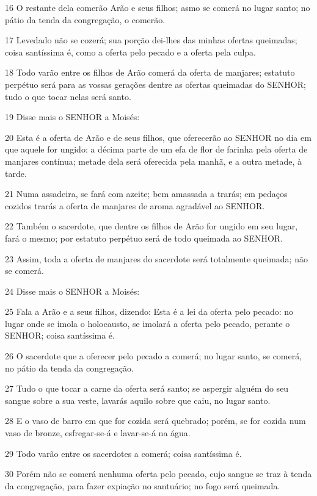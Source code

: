 \par 16 O restante dela comerão Arão e seus filhos; asmo se comerá no lugar santo; no pátio da tenda da congregação, o comerão.
\par 17 Levedado não se cozerá; sua porção dei-lhes das minhas ofertas queimadas; coisa santíssima é, como a oferta pelo pecado e a oferta pela culpa.
\par 18 Todo varão entre os filhos de Arão comerá da oferta de manjares; estatuto perpétuo será para as vossas gerações dentre as ofertas queimadas do SENHOR; tudo o que tocar nelas será santo.
\par 19 Disse mais o SENHOR a Moisés:
\par 20 Esta é a oferta de Arão e de seus filhos, que oferecerão ao SENHOR no dia em que aquele for ungido: a décima parte de um efa de flor de farinha pela oferta de manjares contínua; metade dela será oferecida pela manhã, e a outra metade, à tarde.
\par 21 Numa assadeira, se fará com azeite; bem amassada a trarás; em pedaços cozidos trarás a oferta de manjares de aroma agradável ao SENHOR.
\par 22 Também o sacerdote, que dentre os filhos de Arão for ungido em seu lugar, fará o mesmo; por estatuto perpétuo será de todo queimada ao SENHOR.
\par 23 Assim, toda a oferta de manjares do sacerdote será totalmente queimada; não se comerá.
\par 24 Disse mais o SENHOR a Moisés:
\par 25 Fala a Arão e a seus filhos, dizendo: Esta é a lei da oferta pelo pecado: no lugar onde se imola o holocausto, se imolará a oferta pelo pecado, perante o SENHOR; coisa santíssima é.
\par 26 O sacerdote que a oferecer pelo pecado a comerá; no lugar santo, se comerá, no pátio da tenda da congregação.
\par 27 Tudo o que tocar a carne da oferta será santo; se aspergir alguém do seu sangue sobre a sua veste, lavarás aquilo sobre que caiu, no lugar santo.
\par 28 E o vaso de barro em que for cozida será quebrado; porém, se for cozida num vaso de bronze, esfregar-se-á e lavar-se-á na água.
\par 29 Todo varão entre os sacerdotes a comerá; coisa santíssima é.
\par 30 Porém não se comerá nenhuma oferta pelo pecado, cujo sangue se traz à tenda da congregação, para fazer expiação no santuário; no fogo será queimada.

